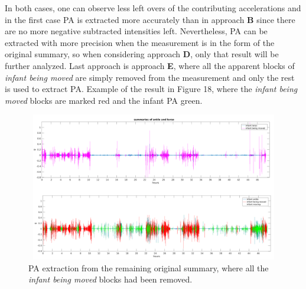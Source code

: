 \documentclass{article}
\begin{document}
{In both cases, one can observe less left overs of the contributing accelerations and in the first case PA is extracted more accurately than in approach \textbf{B} since there are no more negative subtracted intensities left. Nevertheless, PA can be extracted with more precision when the measurement is in the form of the original summary, so when considering approach \textbf{D}, only that result will be further analyzed.
Last approach is approach \textbf{E}, where all the apparent blocks of \textit{infant being moved} are simply removed from the measurement and only the rest is used to extract PA. Example of the result in Figure 18, where the \textit{infant being moved} blocks are marked red and the infant PA green.
\begin{figure}[h]
\includegraphics[width=15cm, height=6.5cm]{approachEPA.png}
\caption{PA extraction from the remaining original summary, where all the \textit{infant being moved} blocks had been removed.}
\end{figure}

}
\end{document}

